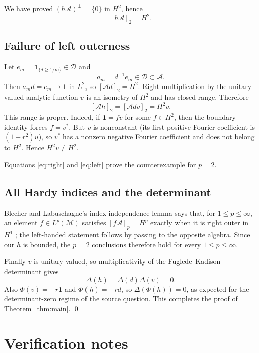 \documentclass[11pt]{article}
\newcommand{\A}{\mathcal A}
\newcommand{\D}{\mathcal D}
\newcommand{\M}{\mathcal M}
\newcommand{\one}{\mathbf 1}
\begin{document}
We have proved $(h\A)^\perp=\{0\}$ in $H^2$, hence
\begin{equation}\label{eq:right}
 [h\A]_2=H^2.
\end{equation}

\subsection{Failure of left outerness}

Let $e_m=\one_{\{d\geq1/m\}}\in\D$ and
\[
 a_m=d^{-1}e_m\in\D\subset\A.
\]
Then $a_md=e_m\to\one$ in $L^2$, so $[\A d]_2=H^2$.  Right multiplication
by the unitary-valued analytic function $v$ is an isometry of $H^2$ and has
closed range.  Therefore
\begin{equation}\label{eq:left}
 [\A h]_2=[\A dv]_2=H^2v.
\end{equation}
This range is proper.  Indeed, if $\one=fv$ for some $f\in H^2$, then the
boundary identity forces $f=v^*$.  But $v$ is nonconstant (its first positive
Fourier coefficient is $(1-r^2)u$), so $v^*$ has a nonzero negative Fourier
coefficient and does not belong to $H^2$.  Hence $H^2v\neq H^2$.

Equations \eqref{eq:right} and \eqref{eq:left} prove the counterexample for
$p=2$.

\subsection{All Hardy indices and the determinant}

Blecher and Labuschagne's index-independence lemma says that, for
$1\leq p\leq\infty$, an element $f\in L^p(\M)$ satisfies
$[f\A]_p=H^p$ exactly when it is right outer in $H^1$
\cite[Lemma~4.1]{BL08}; the left-handed statement follows by passing to the
opposite algebra.  Since our $h$ is bounded, the $p=2$ conclusions therefore
hold for every $1\leq p\leq\infty$.

Finally $v$ is unitary-valued, so multiplicativity of the
Fuglede--Kadison determinant gives
\[
 \Delta(h)=\Delta(d)\Delta(v)=0.
\]
Also $\Phi(v)=-r\one$ and $\Phi(h)=-rd$, so
$\Delta(\Phi(h))=0$, as expected for the determinant-zero regime of the
source question.  This completes the proof of Theorem~\ref{thm:main}.
\qed

\section{Verification notes}
\end{document}
